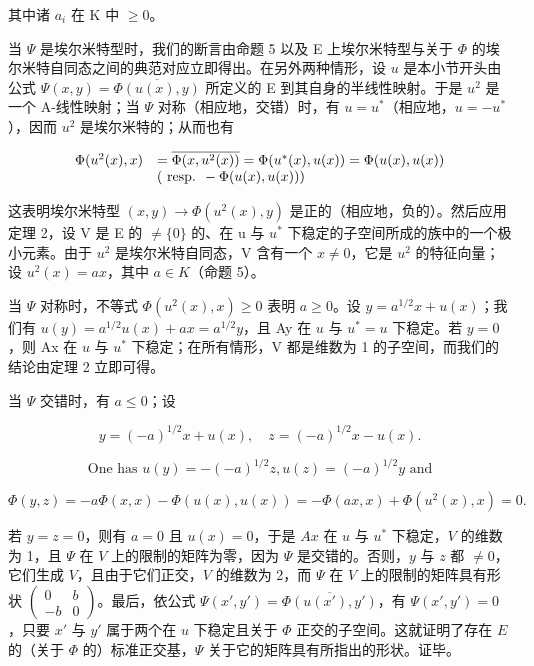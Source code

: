 其中诸 \(a_{i}\) 在 K 中 \(\geqslant 0\)。

当 \(\Psi\) 是埃尔米特型时，我们的断言由命题 5 以及 E 上埃尔米特型与关于 \(\Phi\) 的埃尔米特自同态之间的典范对应立即得出。在另外两种情形，设 \(u\) 是本小节开头由公式 \(\Psi(x, y) = \overline{\Phi(u(x), y)}\) 所定义的 E 到其自身的半线性映射。于是 \(u^2\) 是一个 A-线性映射；当 \(\Psi\) 对称（相应地，交错）时，有 \(u = u^*\)（相应地，\(u = -u^*\)），因而 \(u^2\) 是埃尔米特的；从而也有

\[
\begin{array}{r l} \Phi (u ^ {2} (x), x) & = \overline {{\Phi (x , u ^ {2} (x))}} = \Phi (u ^ {*} (x), u (x)) = \Phi (u (x), u (x)) \\ & (\text { resp. } - \Phi (u (x), u (x))) \end{array}
\]

这表明埃尔米特型 \((x, y) \to \Phi(u^{2}(x), y)\) 是正的（相应地，负的）。然后应用定理 2，设 V 是 E 的 \(\neq\{0\}\) 的、在 u 与 \(u^{*}\) 下稳定的子空间所成的族中的一个极小元素。由于 \(u^{2}\) 是埃尔米特自同态，V 含有一个 \(x \neq 0\)，它是 \(u^{2}\) 的特征向量；设 \(u^{2}(x) = ax\)，其中 \(a \in K\)（命题 5）。

当 \(\Psi\) 对称时，不等式 \(\Phi(u^{2}(x), x) \geqslant 0\) 表明 \(a \geqslant 0\)。设 \(y = a^{1/2}x + u(x)\)；我们有 \(u(y) = a^{1/2}u(x) + ax = a^{1/2}y\)，且 Ay 在 \(u\) 与 \(u^{*} = u\) 下稳定。若 \(y = 0\)，则 Ax 在 \(u\) 与 \(u^{*}\) 下稳定；在所有情形，V 都是维数为 1 的子空间，而我们的结论由定理 2 立即可得。

当 \(\Psi\) 交错时，有 \(a \leqslant 0\)；设

\[
y = (- a) ^ {1 / 2} x + u (x), \quad z = (- a) ^ {1 / 2} x - u (x).
\]

\[
\text { One has } u (y) = - (- a) ^ {1 / 2} z, u (z) = (- a) ^ {1 / 2} y \text { and }
\]

\[
\Phi (y, z) = - a \Phi (x, x) - \Phi (u (x), u (x)) = - \Phi (a x, x) + \Phi (u ^ {2} (x), x) = 0.
\]

若 \(y = z = 0\)，则有 \(a = 0\) 且 \(u(x) = 0\)，于是 \(Ax\) 在 \(u\) 与 \(u^{*}\) 下稳定，\(V\) 的维数为 1，且 \(\Psi\) 在 \(V\) 上的限制的矩阵为零，因为 \(\Psi\) 是交错的。否则，\(y\) 与 \(z\) 都 \(\neq 0\)，它们生成 \(V\)，且由于它们正交，\(V\) 的维数为 2，而 \(\Psi\) 在 \(V\) 上的限制的矩阵具有形状 \(\begin{pmatrix} 0 & b \\ -b & 0 \end{pmatrix}\)。最后，依公式 \(\Psi(x', y') = \overline{\Phi(u(x'), y')}\)，有 \(\Psi(x', y') = 0\)，只要 \(x'\) 与 \(y'\) 属于两个在 \(u\) 下稳定且关于 \(\Phi\) 正交的子空间。这就证明了存在 \(E\) 的（关于 \(\Phi\) 的）标准正交基，\(\Psi\) 关于它的矩阵具有所指出的形状。证毕。

